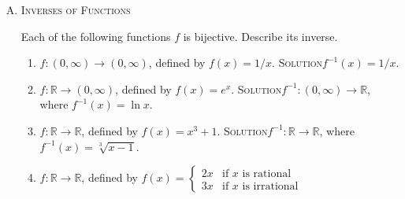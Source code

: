 \documentclass[twoside]{amsart}
\newcommand{\Reals}{\mathbb{R}{}}
\newcommand{\solution}{\textsc{Solution}\xspace}
\begin{document}
\begin{enumerate}[A.]
   . $G$ is a group, and $a$ and $b$ are elements of $G$.
   $f:G\to G$ is defined by $f(x)=ax$. $g:G\to G$ is defined by 
   $g(x)=bx$. Find $f \circ g$ and $g \circ f$.

   \noindent \solution $[f \circ g ](x) = abx$. $[g \circ f](x) = bax$.

   . Indicate the domain and range of each of the 
   composite functions you round in parts 1 to 6.

   \noindent \solution 1) $f \circ g$: The domain is $\mathbb{R}$. The 
   range of $g$ is $\mathbb{R}^+$. The range of $f \circ g$ is $(0,1]$.
   $g \circ f$: The domain is $\mathbb{R}$. 
   The range of $f$ is $[-1,1]$. The range of $g \circ f$ is $[e^{-1},e^1]$.

   2) The domain is $A \times B$. The range is $B$.

   3) $g \circ f$:  The domain is $(0,1)$. The range of $f$ is $[1,\infty)$, 
   so the range of $g \circ f$ is $[0,\infty)$. 

   4) Domain is \verb=Char*=, and the range is \verb=Char*=.

   5) $f \circ g$: Domain is $A$. Range is $\{a,c\}$. $g \circ f$: 
   Domain is $A$. Range is $\{b\}$.

   6) $f \circ g$: Domain is $G$. Range is $\{abx : x \in G\}$.
   $g \circ f$: Domain is $G$. Range is $\{bax : x \in G\}$.

   \item \textsc{Inverses of Functions}

   \noindent Each of the following functions $f$ is bijective. Describe
   its inverse.

   \begin{enumerate}[1]
   \item $f:(0,\infty)\to(0,\infty)$, defined by $f(x)=1/x$.
       \solution $f^{-1}(x)=1/x$.

   \item $f:\mathbb{R}\to(0,\infty)$, defined by $f(x)=e^x$.
       \solution $f^{-1}:(0,\infty)\to\mathbb{R}$, where
       $f^{-1}(x) = \ln x$.

   \item $f:\mathbb{R}\to\mathbb{R}$, defined by $f(x)=x^3+1$.
       \solution $f^{-1}:\Reals\to\Reals$, where $f^{-1}(x)=\sqrt[3]{x-1}$.

   \item $f:\Reals\to\Reals$, defined by $f(x)= \displaystyle
      \begin{cases}
         2x & \text{if $x$ is rational} \\
	 3x & \text{if $x$ is irrational}
      \end{cases}$


\end{enumerate}
\end{enumerate}
\end{document}
